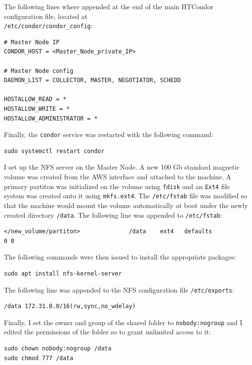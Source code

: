 \documentclass{article}
\begin{document}
The following lines where appended at the end of the main HTCondor configuration file, located at\\
\texttt{/etc/condor/condor\_config}:

\begin{lstlisting}
# Master Node IP
CONDOR_HOST = <Master_Node_private_IP>

# Master Node config 
DAEMON_LIST = COLLECTOR, MASTER, NEGOTIATOR, SCHEDD

HOSTALLOW_READ = *
HOSTALLOW_WRITE = *
HOSTALLOW_ADMINISTRATOR = *
\end{lstlisting}

Finally, the \texttt{condor} service was restarted with the following command:

\begin{lstlisting}
sudo systemctl restart condor
\end{lstlisting}

I set up the NFS server on the Master Node.
A new 100 Gb standard magnetic volume was created from the AWS interface and attached to the machine.
A primary partiton was initialized on the volume using \texttt{fdisk} and an \texttt{Ext4} file system was created onto it using \texttt{mkfs.ext4}.
The \texttt{/etc/fstab} file was modified so that the machine would mount the volume automatically at boot under the newly created directory \texttt{/data}.
The following line was appended to \texttt{/etc/fstab}:

\begin{lstlisting}
</new_volume/partiton>              /data    ext4   defaults                0 0
\end{lstlisting}

The following commands were then issued to install the appropriate packages:

\begin{lstlisting}
sudo apt install nfs-kernel-server
\end{lstlisting}

The following line was appended to the NFS configuration file \texttt{/etc/exports}:

\begin{lstlisting}
/data 172.31.0.0/16(rw,sync,no_wdelay)
\end{lstlisting}

Finally, I set the owner and group of the shared folder to \texttt{nobody:nogroup} and I edited the permissions of the folder so to grant unlimited access to it:

\begin{lstlisting}
sudo chown nobody:nogroup /data
sudo chmod 777 /data
\end{lstlisting}
\end{document}
